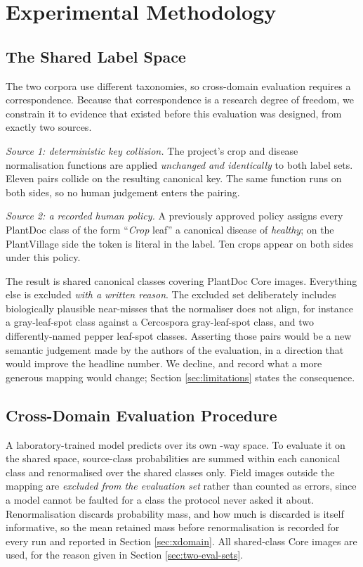 \documentclass[runningheads]{llncs}
\begin{document}
\section{Experimental Methodology}

\subsection{The Shared Label Space}
\label{sec:mapping}

The two corpora use different taxonomies, so cross-domain evaluation requires a
correspondence. Because that correspondence is a research degree of freedom, we
constrain it to evidence that existed before this evaluation was designed, from
exactly two sources.

\emph{Source 1: deterministic key collision.} The project's crop and disease
normalisation functions are applied \emph{unchanged and identically} to both
label sets. Eleven pairs collide on the resulting canonical key. The same
function runs on both sides, so no human judgement enters the pairing.

\emph{Source 2: a recorded human policy.} A previously approved policy assigns
every PlantDoc class of the form ``\textit{Crop} leaf'' a canonical disease of
\textit{healthy}; on the PlantVillage side the token is literal in the label.
Ten crops appear on both sides under this policy.

The result is \NSharedClasses{} shared canonical classes covering \NXdImages{}
PlantDoc Core images. Everything else is excluded \emph{with a written reason}.
The excluded set deliberately includes biologically plausible near-misses that
the normaliser does not align, for instance a gray-leaf-spot class against a
Cercospora gray-leaf-spot class, and two differently-named pepper leaf-spot
classes. Asserting those pairs would be a new semantic judgement made by the
authors of the evaluation, in a direction that would improve the headline
number. We decline, and record what a more generous mapping would change; Section
\ref{sec:limitations} states the consequence.

\subsection{Cross-Domain Evaluation Procedure}

A laboratory-trained model predicts over its own \NPvClasses{}-way space. To
evaluate it on the shared space, source-class probabilities are summed within
each canonical class and renormalised over the \NSharedClasses{} shared classes
only. Field images outside the mapping are \emph{excluded from the evaluation
set} rather than counted as errors, since a model cannot be faulted for a class
the protocol never asked it about. Renormalisation discards probability mass,
and how much is discarded is itself informative, so the mean retained mass before
renormalisation is recorded for every run and reported in Section
\ref{sec:xdomain}. All \NXdImages{} shared-class Core images are used, for the
reason given in Section \ref{sec:two-eval-sets}.
\end{document}
